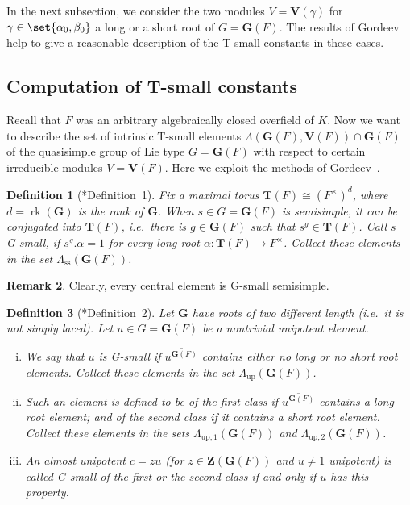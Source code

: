 \documentclass[a4paper,12pt]{amsproc}
\DeclareMathOperator{\rk}{rk}%
\theoremstyle{plain}
\newtheorem{definition}{Definition}[section]
\theoremstyle{definition}
\newtheorem{remark}[definition]{Remark}
\begin{document}
In the next subsection, we consider the two modules $V=\mathbf{V}(\gamma)$ for $\gamma\in\set{\alpha_0,\beta_0}$ a long or a short root of $G=\mathbf{G}(F)$. The results of Gordeev~\cite{gordeev1997freedom} help to give a reasonable description of the T-small constants in these cases.

\subsection{Computation of T-small constants}\label{subsec:cmp_sml_consts}

Recall that $F$ was an arbitrary algebraically closed overfield of $K$. Now we want to describe the set of intrinsic T-small elements $\Lambda(\mathbf{G}(F),\mathbf{V}(F))\cap\mathbf{G}(F)$ of the quasisimple group of Lie type $G=\mathbf{G}(F)$ with respect to certain irreducible modules $V=\mathbf{V}(F)$. Here we exploit the methods of Gordeev~\cite{gordeev1997freedom}.

\begin{definition}[\cite{gordeev1997freedom}*{Definition~1}]\label{def:gord_smll}		Fix a maximal torus $\mathbf{T}(F)\cong (F^\times)^d$, where $d=\rk(\mathbf{G})$ is the rank of $\mathbf{G}$. When $s\in G=\mathbf{G}(F)$ is semisimple, it can be conjugated into $\mathbf{T}(F)$, i.e.\ there is $g\in\mathbf{G}(F)$ such that $s^g\in\mathbf{T}(F)$. Call $s$ \emph{G-small}, if $s^g.\alpha=1$ for every long root $\alpha\colon\mathbf{T}(F)\to F^\times$. Collect these elements in the set $\Lambda_{\text{ss}}(\mathbf{G}(F))$.
\end{definition}

\begin{remark}
Clearly, every central element is G-small semisimple.
\end{remark}
	
\begin{definition}[\cite{gordeev1997freedom}*{Definition~2}]\label{def:sml_upts}
Let $\mathbf{G}$ have roots of two different length (i.e.\ it is not simply laced). Let $u\in G=\mathbf{G}(F)$ be a nontrivial unipotent element. 
\begin{enumerate}[(i)]
\item We say that $u$ is \emph{G-small} if $\overline{u^{\mathbf{G}(F)}}$ contains either no long or no short root elements. Collect these elements in the set $\Lambda_{\text{up}}(\mathbf{G}(F))$.
\item Such an element is defined to be of the \emph{first class} if $\overline{u^{\mathbf{G}(F)}}$ contains a long root element; and of the \emph{second class} if it contains a short root element. Collect these elements in the sets $\Lambda_{\text{up},1}(\mathbf{G}(F))$ and $\Lambda_{\text{up},2}(\mathbf{G}(F))$. 
\item An almost unipotent $c=zu$ (for $z\in\mathbf{Z}(\mathbf{G}(F))$ and $u\neq 1$ unipotent) is called \emph{G-small} of the \emph{first} or the \emph{second class} if and only if $u$ has this property.
\end{enumerate}
\end{definition}
\end{document}
